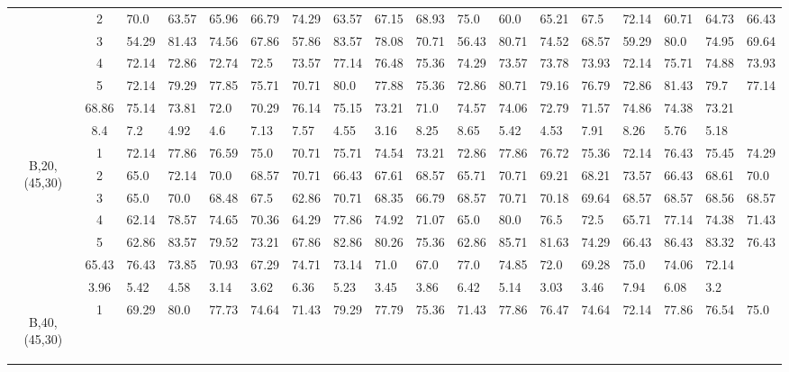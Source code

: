 \begin{table}[h]
{\begin{tabular}{cc|llll|llll|llll|llll}
 & 2 & 70.0 & 63.57 & 65.96 & 66.79 & 74.29 & 63.57 & 67.15 & 68.93 & 75.0 & 60.0 & 65.21 & 67.5 & 72.14 & 60.71 & 64.73 & 66.43 \\
 & 3 & 54.29 & 81.43 & 74.56 & 67.86 & 57.86 & 83.57 & 78.08 & 70.71 & 56.43 & 80.71 & 74.52 & 68.57 & 59.29 & 80.0 & 74.95 & 69.64 \\
 & 4 & 72.14 & 72.86 & 72.74 & 72.5 & 73.57 & 77.14 & 76.48 & 75.36 & 74.29 & 73.57 & 73.78 & 73.93 & 72.14 & 75.71 & 74.88 & 73.93 \\
 & 5 & 72.14 & 79.29 & 77.85 & 75.71 & 70.71 & 80.0 & 77.88 & 75.36 & 72.86 & 80.71 & 79.16 & 76.79 & 72.86 & 81.43 & 79.7 & 77.14 \\
\rowcolor{lightgray!50}\multicolumn{2}{r|}{avg} & 68.86 & 75.14 & 73.81 & 72.0 & 70.29 & 76.14 & 75.15 & 73.21 & 71.0 & 74.57 & 74.06 & 72.79 & 71.57 & 74.86 & 74.38 & 73.21 \\
\rowcolor{lightgray!50}\multicolumn{2}{r|}{std} & 8.4 & 7.2 & 4.92 & 4.6 & 7.13 & 7.57 & 4.55 & 3.16 & 8.25 & 8.65 & 5.42 & 4.53 & 7.91 & 8.26 & 5.76 & 5.18 \\
\multirow{5}{*}{\begin{sideways}B,20,(45,30)\end{sideways}} & 1 & 72.14 & 77.86 & 76.59 & 75.0 & 70.71 & 75.71 & 74.54 & 73.21 & 72.86 & 77.86 & 76.72 & 75.36 & 72.14 & 76.43 & 75.45 & 74.29 \\
 & 2 & 65.0 & 72.14 & 70.0 & 68.57 & 70.71 & 66.43 & 67.61 & 68.57 & 65.71 & 70.71 & 69.21 & 68.21 & 73.57 & 66.43 & 68.61 & 70.0 \\
 & 3 & 65.0 & 70.0 & 68.48 & 67.5 & 62.86 & 70.71 & 68.35 & 66.79 & 68.57 & 70.71 & 70.18 & 69.64 & 68.57 & 68.57 & 68.56 & 68.57 \\
 & 4 & 62.14 & 78.57 & 74.65 & 70.36 & 64.29 & 77.86 & 74.92 & 71.07 & 65.0 & 80.0 & 76.5 & 72.5 & 65.71 & 77.14 & 74.38 & 71.43 \\
 & 5 & 62.86 & 83.57 & 79.52 & 73.21 & 67.86 & 82.86 & 80.26 & 75.36 & 62.86 & 85.71 & 81.63 & 74.29 & 66.43 & 86.43 & 83.32 & 76.43 \\
\rowcolor{lightgray!50}\multicolumn{2}{r|}{avg} & 65.43 & 76.43 & 73.85 & 70.93 & 67.29 & 74.71 & 73.14 & 71.0 & 67.0 & 77.0 & 74.85 & 72.0 & 69.28 & 75.0 & 74.06 & 72.14 \\
\rowcolor{lightgray!50}\multicolumn{2}{r|}{std} & 3.96 & 5.42 & 4.58 & 3.14 & 3.62 & 6.36 & 5.23 & 3.45 & 3.86 & 6.42 & 5.14 & 3.03 & 3.46 & 7.94 & 6.08 & 3.2 \\
\multirow{5}{*}{\begin{sideways}B,40,(45,30)\end{sideways}} & 1 & 69.29 & 80.0 & 77.73 & 74.64 & 71.43 & 79.29 & 77.79 & 75.36 & 71.43 & 77.86 & 76.47 & 74.64 & 72.14 & 77.86 & 76.54 & 75.0 \\

\end{tabular}}
\end{table}
